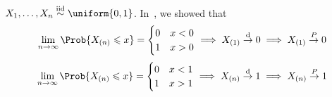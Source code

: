 \begin{Example}{}{}
    $ X_1,\ldots,X_n \stackrel{\text{iid}}{\sim}\uniform{0,1} $.
    In~, we showed that
    \[ \lim\limits_{{n} \to {\infty}} \Prob{X_{(n)}\leqslant x}=
        \begin{cases}
            0 & x<0 \\
            1 & x>0
        \end{cases}\implies X_{(1)}\stackrel{\text{d}}{\to}0
        \implies X_{(1)}\stackrel{\mathbb{P}}{\to}0 \]
    \[ \lim\limits_{{n} \to {\infty}} \Prob{X_{(n)}\leqslant x}=
        \begin{cases}
            0 & x<1 \\
            1 & x>1
        \end{cases}\implies X_{(n)}\stackrel{\text{d}}{\to}1\implies
        X_{(n)}\stackrel{\mathbb{P}}{\to}1 \]
\end{Example}
